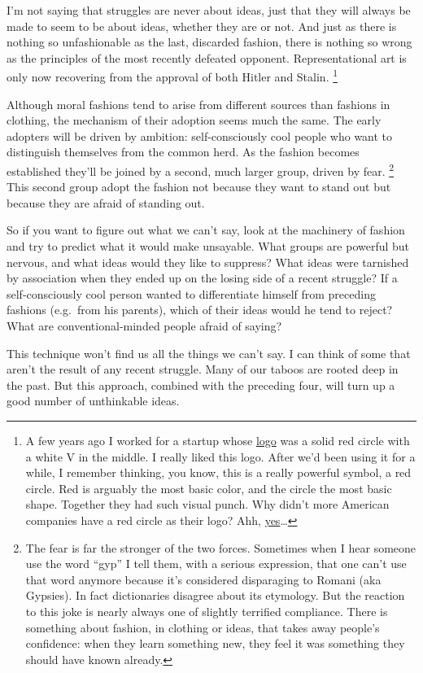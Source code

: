 \documentclass[12pt]{book}
\begin{document}
I'm not saying that struggles are never about ideas, just that they will
always be made to seem to be about ideas, whether they are or not. And
just as there is nothing so unfashionable as the last, discarded
fashion, there is nothing so wrong as the principles of the most
recently defeated opponent. Representational art is only now recovering
from the approval of both Hitler and Stalin. \footnote{A few years ago I worked for a startup whose
\href{vwfront.html}{logo} was a solid red circle with a white V in the
middle. I really liked this logo. After we'd been using it for a while,
I remember thinking, you know, this is a really powerful symbol, a red
circle. Red is arguably the most basic color, and the circle the most
basic shape. Together they had such visual punch. Why didn't more
American companies have a red circle as their logo? Ahh,
\href{zero.html}{yes}\ldots{}}

Although moral fashions tend to arise from different sources than
fashions in clothing, the mechanism of their adoption seems much the
same. The early adopters will be driven by ambition: self-consciously
cool people who want to distinguish themselves from the common herd. As
the fashion becomes established they'll be joined by a second, much
larger group, driven by fear. \footnote{The fear is far the stronger of the two forces. Sometimes when I
hear someone use the word ``gyp'' I tell them, with a serious
expression, that one can't use that word anymore because it's considered
disparaging to Romani (aka Gypsies). In fact dictionaries disagree about
its etymology. But the reaction to this joke is nearly always one of
slightly terrified compliance. There is something about fashion, in
clothing or ideas, that takes away people's confidence: when they learn
something new, they feel it was something they should have known
already.} This second group adopt the
fashion not because they want to stand out but because they are afraid
of standing out.

So if you want to figure out what we can't say, look at the machinery of
fashion and try to predict what it would make unsayable. What groups are
powerful but nervous, and what ideas would they like to suppress? What
ideas were tarnished by association when they ended up on the losing
side of a recent struggle? If a self-consciously cool person wanted to
differentiate himself from preceding fashions (e.g.~from his parents),
which of their ideas would he tend to reject? What are
conventional-minded people afraid of saying?

This technique won't find us all the things we can't say. I can think of
some that aren't the result of any recent struggle. Many of our taboos
are rooted deep in the past. But this approach, combined with the
preceding four, will turn up a good number of unthinkable ideas.
\end{document}
